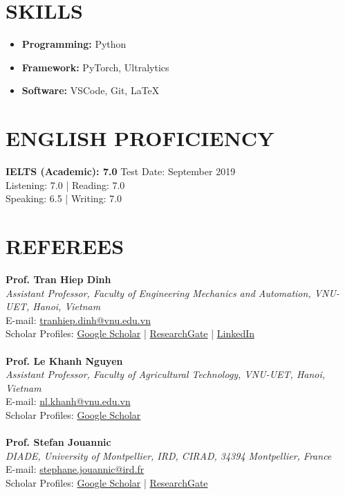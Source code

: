 \documentclass[a4paper,9pt]{extarticle}
\begin{document}
\section*{SKILLS}
\begin{itemize}
    \item \textbf{Programming:} Python
    \item \textbf{Framework:} PyTorch, Ultralytics
    \item \textbf{Software:} VSCode, Git, LaTeX
\end{itemize}

\section*{ENGLISH PROFICIENCY}
\noindent\textbf{IELTS (Academic): 7.0} \hfill Test Date: September 2019\\ 
Listening: 7.0 | Reading: 7.0 \\
Speaking: 6.5 | Writing: 7.0 

\section*{REFEREES}
\label{sec:referees}
\textbf{Prof. Tran Hiep Dinh}\\
\textit{Assistant Professor, Faculty of Engineering Mechanics and Automation, VNU-UET, Hanoi, Vietnam}\\
E-mail: \href{mailto:tranhiep.dinh@vnu.edu.vn}{tranhiep.dinh@vnu.edu.vn}\\
Scholar Profiles: \href{https://scholar.google.com/citations?user=fJYX_zsAAAAJ&hl=en&oi=ao}{Google Scholar} | \href{https://www.researchgate.net/profile/Tran-Hiep-Dinh}{ResearchGate} | \href{https://www.linkedin.com/in/tran-hiep-dinh/}{LinkedIn}\\ \\
\textbf{Prof. Le Khanh Nguyen}\\
\textit{Assistant Professor, Faculty of Agricultural Technology, VNU-UET, Hanoi, Vietnam}\\
E-mail: \href{mailto:nl.khanh@vnu.edu.vn}{nl.khanh@vnu.edu.vn}\\
Scholar Profiles: \href{https://scholar.google.com/citations?user=E-1iGYIAAAAJ&hl=en&oi=ao}{Google Scholar} \\ \\
\textbf{Prof. Stefan Jouannic}\\
\textit{DIADE, University of Montpellier, IRD, CIRAD, 34394 Montpellier, France}\\
E-mail: \href{mailto:stephane.jouannic@ird.fr}{stephane.jouannic@ird.fr}\\
Scholar Profiles: \href{https://scholar.google.com/citations?user=y5kP-ZAAAAAJ&hl=vi}{Google Scholar} | \href{https://www.researchgate.net/profile/Stefan-Jouannic}{ResearchGate}\\ \\

\end{document}

